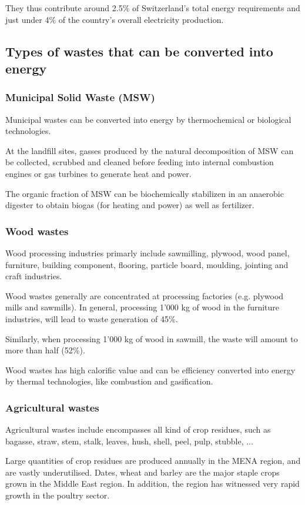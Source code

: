 \documentclass{article}
\begin{document}
They thus contribute around 2.5\% of Switzerland's total energy requirements
and just under 4\% of the country's overall electricity production.

\subsection{Types of wastes that can be converted into energy}
\subsubsection{Municipal Solid Waste (MSW)}
Municipal wastes can be converted into energy by thermochemical or biological technologies.

At the landfill sites, gasses produced by the natural decomposition of MSW can be collected,
scrubbed and cleaned before feeding into internal combustion engines or gas turbines to
generate heat and power.

The organic fraction of MSW can be biochemically stabilizen in an anaerobic digester to
obtain biogas (for heating and power) as well as fertilizer.

\subsubsection{Wood wastes}
Wood processing industries primarly include sawmilling, plywood, wood panel, furniture,
building component, flooring, particle board, moulding, jointing and craft industries.

Wood wastes generally are concentrated at processing factories (e.g. plywood mills and
sawmills). In general, processing 1'000 kg of wood in the furniture industries, will lead to
waste generation of 45\%.

Similarly, when processing 1'000 kg of wood in sawmill, the waste will amount to more than
half (52\%).

Wood wastes has high calorific value and can be efficiency converted into energy
by thermal technologies, like combustion and gasification.

\subsubsection{Agricultural wastes}
Agricultural wastes include encompasses all kind of crop residues, such as bagasse, straw,
stem, stalk, leaves, hush, shell, peel, pulp, stubble, ...

Large quantities of crop residues are produced annually in the MENA region, and are vastly underutilised.
Dates, wheat and barley are the major staple crops grown in the Middle East region.
In addition, the region has witnessed very rapid growth in the poultry sector.
\end{document}
